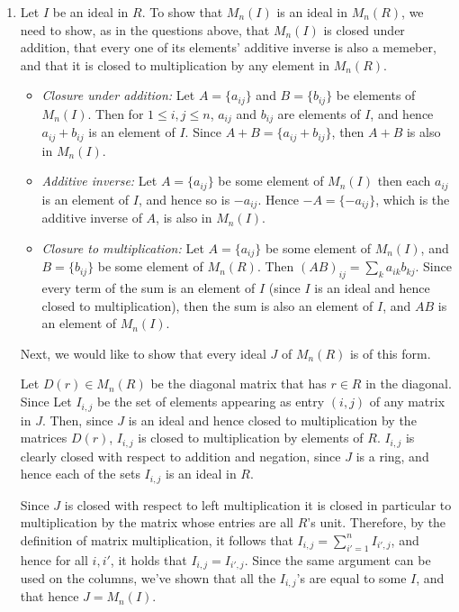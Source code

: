 \documentclass[11pt]{article} \usepackage{amssymb}
\begin{document}
\begin{enumerate}
    \item 
      Let $I$ be an ideal in $R$. To show that $M_n(I)$ is an ideal in
      $M_n(R)$, we need to show, as in the questions above, 
      that $M_n(I)$ is closed under addition,
      that every one of its elements' additive inverse 
      is also a memeber, and that it is closed to multiplication by any
      element in $M_n(R)$.
      \begin{itemize}
      \item {\em Closure under addition:} 
        Let $A=\{a_{ij}\}$ and $B=\{b_{ij}\}$ be elements of $M_n(I)$. Then
        for $1\leq i,j\leq n$, $a_{ij}$ and $b_{ij}$ are elements of $I$,
        and hence $a_{ij}+b_{ij}$ is an element of $I$. Since 
        $A+B=\{a_{ij}+b_{ij}\}$, then $A+B$ is also in $M_n(I)$.
      \item {\em Additive inverse:} Let $A=\{a_{ij}\}$ be some element of 
        $M_n(I)$ then each $a_{ij}$ is an element of $I$, and hence so is 
        $-a_{ij}$. Hence $-A=\{-a_{ij}\}$, which is the additive inverse of $A$,
        is also in $M_n(I)$.
      \item {\em Closure to multiplication:} Let $A=\{a_{ij}\}$ be some 
        element of $M_n(I)$, and $B=\{b_{ij}\}$ be some element of 
        $M_n(R)$. Then $(AB)_{ij}=\sum_ka_{ik}b_{kj}$. Since every term of the
        sum is an element of $I$ (since $I$ is an ideal and hence closed to 
        multiplication), then the sum is also an element of $I$, and 
        $AB$ is an element of $M_n(I)$.
      \end{itemize}

      Next, we would like to show that every ideal $J$ of $M_n(R)$ is of 
      this form. 

      Let $D(r)\in M_n(R)$ be the diagonal matrix that has $r\in R$ in the
      diagonal. Since
      Let $I_{i,j}$ be the set of elements appearing as entry $(i,j)$ of any
      matrix in $J$. Then, since $J$ is an ideal and hence closed to 
      multiplication by the matrices $D(r)$, $I_{i,j}$ is closed to 
      multiplication by elements of $R$. 
      $I_{i,j}$ is clearly closed with respect to addition and negation, 
      since $J$ is a ring, and hence each of the sets $I_{i,j}$ is an ideal
      in $R$. 

      Since $J$ is closed with respect to left multiplication it is closed
      in particular to multiplication by the matrix whose entries are
      all $R$'s unit. Therefore, 
      by the definition of matrix multiplication, it follows that
      $I_{i,j}=\sum_{i'=1}^nI_{i',j}$, and hence for all $i,i'$, it holds that
      $I_{i,j}=I_{i',j}$. Since the same argument can be used on the columns, 
      we've shown that all the $I_{i,j}$'s are equal to some $I$, and that 
      hence $J=M_n(I)$.
    
\end{enumerate}
\end{document}
